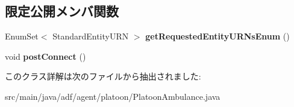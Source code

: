 \subsection*{限定公開メンバ関数}
\begin{DoxyCompactItemize}
\item 
\hypertarget{classadf_1_1agent_1_1platoon_1_1PlatoonAmbulance_af335b4d2802125b7ea425465b553368c}{}\label{classadf_1_1agent_1_1platoon_1_1PlatoonAmbulance_af335b4d2802125b7ea425465b553368c} 
Enum\+Set$<$ Standard\+Entity\+U\+RN $>$ {\bfseries get\+Requested\+Entity\+U\+R\+Ns\+Enum} ()
\item 
\hypertarget{classadf_1_1agent_1_1platoon_1_1PlatoonAmbulance_a68c9e9c3987f60dc81a5515fc4d77684}{}\label{classadf_1_1agent_1_1platoon_1_1PlatoonAmbulance_a68c9e9c3987f60dc81a5515fc4d77684} 
void {\bfseries post\+Connect} ()
\end{DoxyCompactItemize}


このクラス詳解は次のファイルから抽出されました\+:\begin{DoxyCompactItemize}
\item 
src/main/java/adf/agent/platoon/Platoon\+Ambulance.\+java\end{DoxyCompactItemize}
